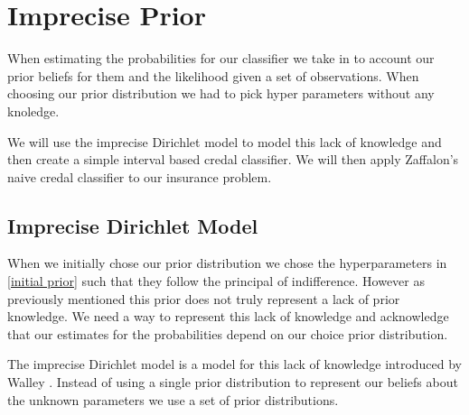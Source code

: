 \newcommand{\sn}[2]{\ensuremath{{#1}\times 10^{#2}}}

\chapter{Imprecise Prior}

When estimating the probabilities for our classifier we take in to account our prior beliefs for them and the likelihood given a set of observations.
When choosing our prior distribution we had to pick hyper parameters without any knoledge.

We will use the imprecise Dirichlet model to model this lack of knowledge and then create a simple interval based credal classifier.
We will then apply Zaffalon's naive credal classifier to our insurance problem.

\section{Imprecise Dirichlet Model}

When we initially chose our prior distribution we chose the hyperparameters in \cref{initial prior} such that they follow the principal of indifference.
However as previously mentioned this prior does not truly represent a lack of prior knowledge.
We need a way to represent this lack of knowledge and acknowledge that our estimates for the probabilities depend on our choice prior distribution.

The imprecise Dirichlet model is a model for this lack of knowledge introduced by Walley \cite{Walley96}.
Instead of using a single prior distribution to represent our beliefs about the unknown parameters we use a set of prior distributions.

